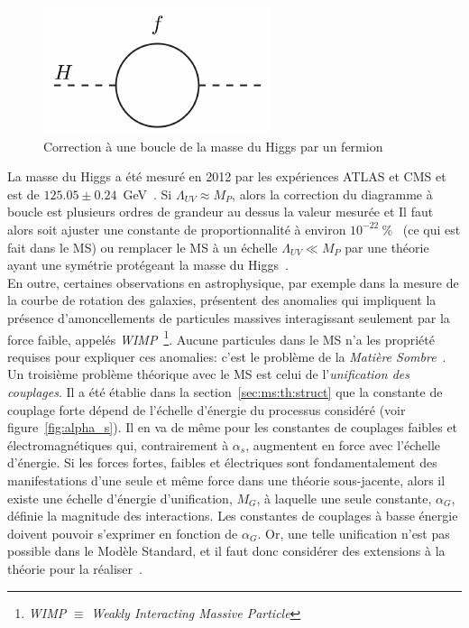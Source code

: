 \begin{figure}
  \centering
  \includegraphics{higgs-loop.pdf}
  \caption{Correction à une boucle de la masse du Higgs par un fermion}
  \label{fig:hloop}
\end{figure}

La masse du Higgs a été mesuré en 2012 par les expériences ATLAS et
CMS et est de
$125.05 \pm 0.24$~GeV~\cite{atlas_collaboration_combined_2015}. Si
$\Lambda_{UV} \approx M_P$, alors la correction du diagramme à boucle
est plusieurs ordres de grandeur au dessus la valeur mesurée et Il
faut alors soit ajuster une constante de proportionnalité à environ
$10^{-22}~\%$~\cite{giudice_naturally_20087} (ce qui est fait dans le
MS) ou remplacer le MS à un échelle $\Lambda_{UV} \ll M_P$ par une
théorie ayant une symétrie protégeant la masse du
Higgs~\cite{martin_supersymmetry_1997}. \\

En outre, certaines observations en astrophysique, par exemple dans la
mesure de la courbe de rotation des galaxies, présentent des anomalies
qui impliquent la présence d'amoncellements de particules massives
interagissant seulement par la force faible, appelés
\emph{WIMP}~\footnote{\emph{WIMP} $\equiv$ \emph{Weakly Interacting
    Massive Particle}}. Aucune particules dans le MS n'a les propriété
requises pour expliquer ces anomalies: c'est le problème de la
\emph{Matière Sombre}~\cite{bertone_particle_2005}. \\

Un troisième problème théorique avec le MS est celui de
l'\emph{unification des couplages}. Il a été établie dans la
section~\ref{sec:ms:th:struct} que la constante de couplage forte
dépend de l'échelle d'énergie du processus considéré (voir
figure~\ref{fig:alpha_s}). Il en va de même pour les constantes de
couplages faibles et électromagnétiques qui, contrairement à
$\alpha_s$, augmentent en force avec l'échelle d'énergie. Si les
forces fortes, faibles et électriques sont fondamentalement des
manifestations d'une seule et même force dans une théorie
sous-jacente, alors il existe une échelle d'énergie d'unification,
$M_G$, à laquelle une seule constante, $\alpha_G$, définie la magnitude
des interactions. Les constantes de couplages à basse énergie doivent pouvoir
s'exprimer en fonction de $\alpha_G$. Or, une telle unification n'est
pas possible dans le Modèle Standard, et il faut donc considérer des
extensions à la théorie pour la réaliser~\cite{olive_review_2014,thomson_modern_2013}.


